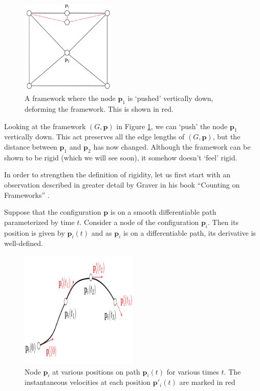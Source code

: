 \begin{figure}[htbp]
    \centering
    \includegraphics[width = 0.4\textwidth]{Chapter 2/9. not_inf_rigid.png}
    \caption{A framework where the node $\textbf{p}_1$ is `pushed' vertically down, deforming the framework. This is shown in red.}
    \label{fig: not_inf_rigid}
\end{figure}
\vspace{-3 mm}
\begin{flushleft}
Looking at the framework $(G,\textbf{p})$ in Figure \ref{fig: not_inf_rigid}, we can `push' the node $\textbf{p}_1$ vertically down. This act preserves all the edge lengths of $(G,\textbf{p})$, but the distance between $\textbf{p}_1$ and $\textbf{p}_2$ has now changed. Although the framework can be shown to be rigid (which we will see soon), it somehow doesn't `feel' rigid.
\end{flushleft}

\begin{flushleft}
In order to strengthen the definition of rigidity, let us first start with an observation described in greater detail by Graver in his book ``Counting on Frameworks'' \cite{counting_frameworks}. 
\end{flushleft}

\begin{flushleft}
Suppose that the configuration $\mathbf{p}$ is on a smooth differentiable path parameterized by time $t$. Consider a node of the configuration $\mathbf{p}_i$. Then its position is given by $\mathbf{p}_i(t)$ and as $\mathbf{p}_i$ is on a differentiable path, its derivative is well-defined.
\end{flushleft}

\begin{figure}[htbp]
    \centering
    \includegraphics[width = 0.5\textwidth]{Chapter 2/12. path.png}
    \caption{Node $\mathbf{p}_i$ at various positions on path $\mathbf{p}_i(t)$ for various times $t$. The instantaneous velocities at each position $\mathbf{p}'_i(t)$ are marked in red}
    \label{fig: path}
\end{figure}

